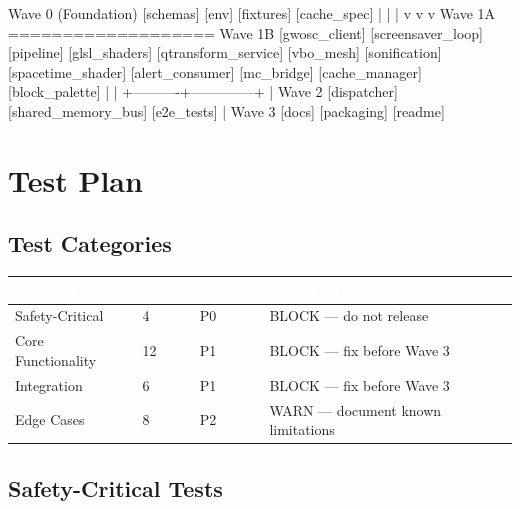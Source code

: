 \documentclass[11pt,letterpaper]{article}
\newcommand{\tableheader}[1]{\textbf{\sffamily\textcolor{white}{#1}}}
\begin{document}
\begin{asciibox}
Wave 0 (Foundation)
  [schemas] [env] [fixtures] [cache_spec]
      |           |             |
      v           v             v
   Wave 1A =================== Wave 1B
   [gwosc_client]              [screensaver_loop]
   [pipeline]                  [glsl_shaders]
   [qtransform_service]        [vbo_mesh]
   [sonification]              [spacetime_shader]
   [alert_consumer]            [mc_bridge]
   [cache_manager]             [block_palette]
         |                         |
         +----------+--------------+
                    |
                 Wave 2
                 [dispatcher]
                 [shared_memory_bus]
                 [e2e_tests]
                    |
                 Wave 3
                 [docs] [packaging] [readme]
\end{asciibox}

\section{Test Plan}

\subsection{Test Categories}

\begin{center}
\begin{tabularx}{\textwidth}{L{3cm}C{1.5cm}L{2cm}X}
\toprule
{}
\tableheader{Category} & \tableheader{Count} & \tableheader{Priority} & \tableheader{Action on Fail} \\
\midrule
Safety-Critical & 4 & P0 & BLOCK --- do not release \\
Core Functionality & 12 & P1 & BLOCK --- fix before Wave 3 \\
Integration & 6 & P1 & BLOCK --- fix before Wave 3 \\
Edge Cases & 8 & P2 & WARN --- document known limitations \\
\bottomrule
\end{tabularx}
\end{center}

\subsection{Safety-Critical Tests}
\end{document}
